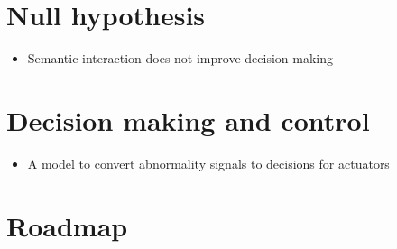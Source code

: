 \documentclass{article}
\begin{document}
	\section{Null hypothesis}
		\begin{itemize}
			\item Semantic interaction does not improve decision making
		\end{itemize}
	
	\section{Decision making and control}
		\begin{itemize}
			\item A model to convert abnormality signals to decisions for actuators 
		\end{itemize}
	
	\section{Roadmap}
	
	
\end{document}
